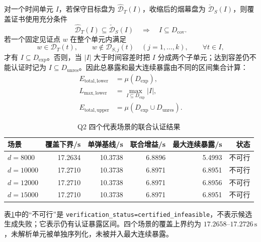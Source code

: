 对一个时间单元 $I$，若保守目标盘为 $\widehat{\mathcal{D}}_T(I)$，收缩后的烟幕盘为 $\check{\mathcal{D}}_S(I)$，则覆盖证书使用充分条件
\begin{equation}
  \widehat{\mathcal{D}}_T(I)\subseteq\check{\mathcal{D}}_S(I)
  \quad\Longrightarrow\quad I\subseteq D_{\mathrm{cov}}.
  \label{eq:q2-covered-cell}
\end{equation}
若一个固定见证点 $w$ 在整个单元内满足
\begin{equation}
  w\in\mathcal{D}_T(t),\qquad
  w\notin\mathcal{D}_{S,j}(t)\quad(j=1,\ldots,k),\qquad \forall t\in I,
  \label{eq:q2-exposed-cell}
\end{equation}
才有 $I\subseteq D_{\mathrm{exp}}$。否则，当 $|I|$ 大于时间容差时把 $I$ 分成两个子单元；达到容差仍不能认证时记为 $I\subseteq D_{\mathrm{unres}}$。因此总暴露和最大连续暴露由不同的区间集合计算：
\begin{align}
  E_{\mathrm{total,lower}} &= \mu(D_{\mathrm{exp}}),\\
  L_{\mathrm{max,lower}} &= \max_{I\subseteq D_{\mathrm{exp}}}|I|,\\
  E_{\mathrm{total,upper}} &= \mu(D_{\mathrm{exp}}\cup D_{\mathrm{unres}}).
  \label{eq:q2-exposure-bounds}
\end{align}

\begin{table}[!htbp]
\centering
\caption{Q2 四个代表场景的联合认证结果}
\label{tab:q2-results}
\begin{tabular}{lrrrrr}
\toprule
场景 & 覆盖下界/s & 单弹基线/s & 联合增益/s & 最大连续暴露/s & 状态 \\
\midrule
$d=8000$ & 17.2634 & 10.3738 & 6.8896 & 5.4993 & 不可行 \\
$d=10000$ & 17.2710 & 10.3738 & 6.8971 & 6.8951 & 不可行 \\
$d=12000$ & 17.2710 & 10.3738 & 6.8971 & 6.8956 & 不可行 \\
$d=15000$ & 17.2710 & 10.3738 & 6.8971 & 6.8951 & 不可行 \\
\bottomrule
\end{tabular}
\end{table}

表\ref{tab:q2-results}中的“不可行”是 \texttt{verification\_status=certified\_infeasible}，不表示候选生成失败；它表示仍有认证暴露区间。四个场景的覆盖上界约为 $17.2658$--$17.2726\,\mathrm{s}$，未解析单元被单独序列化，未被并入最大连续暴露。

